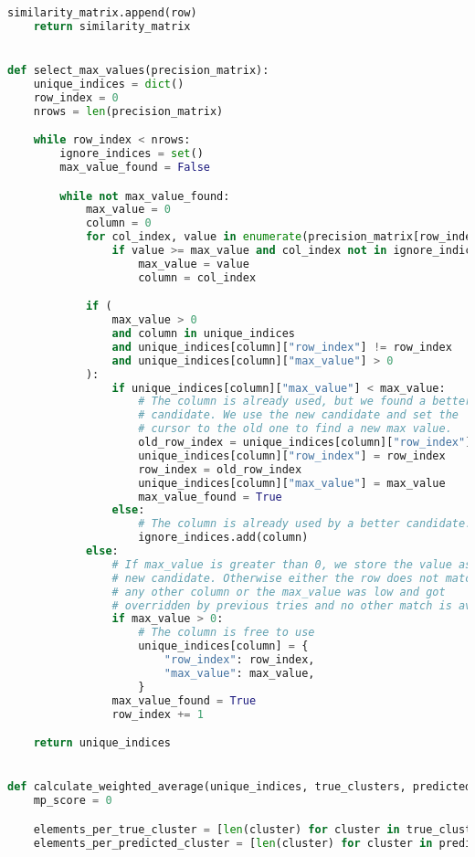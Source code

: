 \begin{lstlisting}[language=Python, caption=Calculate the MP-Score between two clusterings., label={lst:select_max_values}]
        similarity_matrix.append(row)
    return similarity_matrix


def select_max_values(precision_matrix):
    unique_indices = dict()
    row_index = 0
    nrows = len(precision_matrix)

    while row_index < nrows:
        ignore_indices = set()
        max_value_found = False

        while not max_value_found:
            max_value = 0
            column = 0
            for col_index, value in enumerate(precision_matrix[row_index]):
                if value >= max_value and col_index not in ignore_indices:
                    max_value = value
                    column = col_index

            if (
                max_value > 0
                and column in unique_indices
                and unique_indices[column]["row_index"] != row_index
                and unique_indices[column]["max_value"] > 0
            ):
                if unique_indices[column]["max_value"] < max_value:
                    # The column is already used, but we found a better
                    # candidate. We use the new candidate and set the
                    # cursor to the old one to find a new max value.
                    old_row_index = unique_indices[column]["row_index"]
                    unique_indices[column]["row_index"] = row_index
                    row_index = old_row_index
                    unique_indices[column]["max_value"] = max_value
                    max_value_found = True
                else:
                    # The column is already used by a better candidate.
                    ignore_indices.add(column)
            else:
                # If max_value is greater than 0, we store the value as a
                # new candidate. Otherwise either the row does not match
                # any other column or the max_value was low and got
                # overridden by previous tries and no other match is available.
                if max_value > 0:
                    # The column is free to use
                    unique_indices[column] = {
                        "row_index": row_index,
                        "max_value": max_value,
                    }
                max_value_found = True
                row_index += 1

    return unique_indices


def calculate_weighted_average(unique_indices, true_clusters, predicted_clusters):
    mp_score = 0

    elements_per_true_cluster = [len(cluster) for cluster in true_clusters]
    elements_per_predicted_cluster = [len(cluster) for cluster in predicted_clusters]


\end{lstlisting}
